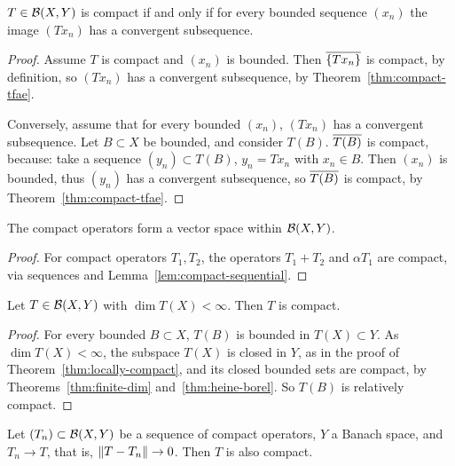 \begin{lemma}\label{lem:compact-sequential}
$T \in \mathcal{B}(X, Y)$ is compact if and only if for every bounded sequence
$(x_n)$ the image $(Tx_n)$ has a convergent subsequence.
\end{lemma}

\begin{proof}
Assume $T$ is compact and $(x_n)$ is bounded. Then $\overline{\{Tx_n\}}$ is
compact, by definition, so $(Tx_n)$ has a convergent subsequence, by
Theorem~\ref{thm:compact-tfae}.

Conversely, assume that for every bounded $(x_n)$, $(Tx_n)$ has a convergent
subsequence. Let $B \subset X$ be bounded, and consider $T(B)$. $\overline{T(B)}$
is compact, because: take a sequence $(y_n) \subset T(B)$, $y_n = Tx_n$ with
$x_n \in B$. Then $(x_n)$ is bounded, thus $(y_n)$ has a convergent
subsequence, so $\overline{T(B)}$ is compact, by Theorem~\ref{thm:compact-tfae}.
\end{proof}

\begin{corollary}\label{cor:compact-vector-space}
The compact operators form a vector space within $\mathcal{B}(X, Y)$.
\end{corollary}

\begin{proof}
For compact operators $T_1, T_2$, the operators $T_1 + T_2$ and
$\alpha T_1$ are compact, via sequences and Lemma~\ref{lem:compact-sequential}.
\end{proof}

\begin{lemma}\label{lem:finite-rank}
Let $T \in \mathcal{B}(X, Y)$ with $\dim T(X) < \infty$. Then $T$ is compact.
\end{lemma}

\begin{proof}
For every bounded $B \subset X$, $T(B)$ is bounded in $T(X) \subset Y$. As
$\dim T(X) < \infty$, the subspace $T(X)$ is closed in $Y$, as in the proof of
Theorem~\ref{thm:locally-compact}, and its closed bounded sets are compact,
by Theorems~\ref{thm:finite-dim} and~\ref{thm:heine-borel}. So $T(B)$ is
relatively compact.
\end{proof}

\begin{theorem}\label{thm:compact-limit}
Let $(T_n) \subset \mathcal{B}(X, Y)$ be a sequence of compact operators, $Y$ a
Banach space, and $T_n \to T$, that is, $\lVert T - T_n\rVert \to 0$. Then $T$ is
also compact.
\end{theorem}

